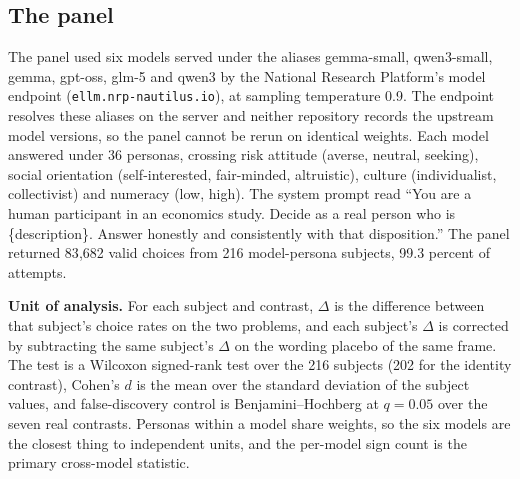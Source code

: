 \documentclass[journal]{IEEEtran}
\begin{document}
\subsection{The panel}
The panel used six models served under the aliases gemma-small, qwen3-small, gemma, gpt-oss, glm-5 and qwen3 by the National Research Platform's model endpoint (\texttt{ellm.nrp-nautilus.io}), at sampling temperature 0.9.
The endpoint resolves these aliases on the server and neither repository records the upstream model versions, so the panel cannot be rerun on identical weights.
Each model answered under 36 personas, crossing risk attitude (averse, neutral, seeking), social orientation (self-interested, fair-minded, altruistic), culture (individualist, collectivist) and numeracy (low, high).
The system prompt read ``You are a human participant in an economics study. Decide as a real person who is \{description\}. Answer honestly and consistently with that disposition.''
The panel returned 83{,}682 valid choices from 216 model-persona subjects, 99.3 percent of attempts.

\textbf{Unit of analysis.}
For each subject and contrast, $\Delta$ is the difference between that subject's choice rates on the two problems, and each subject's $\Delta$ is corrected by subtracting the same subject's $\Delta$ on the wording placebo of the same frame.
The test is a Wilcoxon signed-rank test over the 216 subjects (202 for the identity contrast), Cohen's $d$ is the mean over the standard deviation of the subject values, and false-discovery control is Benjamini--Hochberg at $q=0.05$ over the seven real contrasts.
Personas within a model share weights, so the six models are the closest thing to independent units, and the per-model sign count is the primary cross-model statistic.
\end{document}

